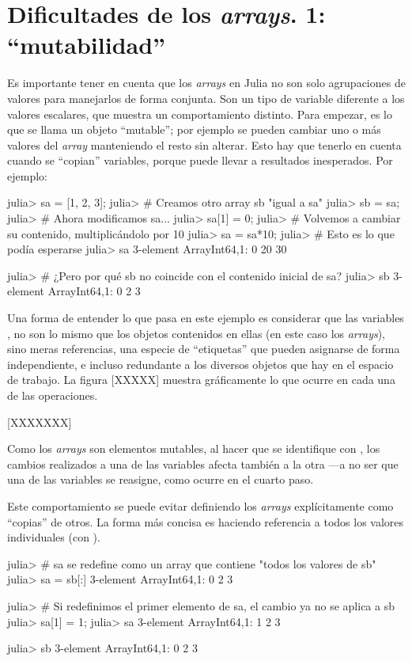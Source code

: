 \section{Dificultades de los \emph{arrays}. 1: ``mutabilidad''}

Es importante tener en cuenta que los \emph{arrays} en Julia no son solo agrupaciones de valores para manejarlos de forma conjunta. Son un tipo de variable diferente a los valores escalares, que muestra un comportamiento distinto. Para empezar, es lo que se llama un objeto ``mutable''; por ejemplo se pueden cambiar uno o más valores del \emph{array} manteniendo el resto sin alterar. Esto hay que tenerlo en cuenta cuando se ``copian'' variables, porque puede llevar a resultados inesperados. Por ejemplo:

\begin{jlconcode}
julia> sa = [1, 2, 3];
julia> # Creamos otro array sb "igual a sa"
julia> sb = sa;
julia> # Ahora modificamos sa...
julia> sa[1] = 0;
julia> # Volvemos a cambiar su contenido, multiplicándolo por 10
julia> sa = sa*10;
julia> # Esto es lo que podía esperarse
julia> sa
3-element Array{Int64,1}:
  0
 20
 30

julia> # ¿Pero por qué sb no coincide con el contenido inicial de sa?
julia> sb
3-element Array{Int64,1}:
 0
 2
 3
\end{jlconcode}

Una forma de entender lo que pasa en este ejemplo es considerar que las variables ,  no son lo mismo que los objetos contenidos en ellas (en este caso los \emph{arrays}), sino meras referencias, una especie de ``etiquetas'' que pueden asignarse de forma independiente, e incluso redundante a los diversos objetos que hay en el espacio de trabajo. La figura [XXXXX] muestra gráficamente lo que ocurre en cada una de las operaciones.

[XXXXXXX]

Como los \emph{arrays} son elementos mutables, al hacer que  se identifique con , los cambios realizados a una de las variables afecta también a la otra ---a no ser que una de las variables se reasigne, como ocurre en el cuarto paso.

Este comportamiento se puede evitar definiendo los \emph{arrays} explícitamente como ``copias'' de otros. La forma más concisa es haciendo referencia a todos los valores individuales (con \jl{[:]}).

\begin{jlconcode}
julia> # sa se redefine como un array que contiene "todos los valores de sb"
julia> sa = sb[:]
3-element Array{Int64,1}:
 0
 2
 3

julia> # Si redefinimos el primer elemento de sa, el cambio ya no se aplica a sb
julia> sa[1] = 1;
julia> sa
3-element Array{Int64,1}:
 1
 2
 3

julia> sb
3-element Array{Int64,1}:
 0
 2
 3
\end{jlconcode}


